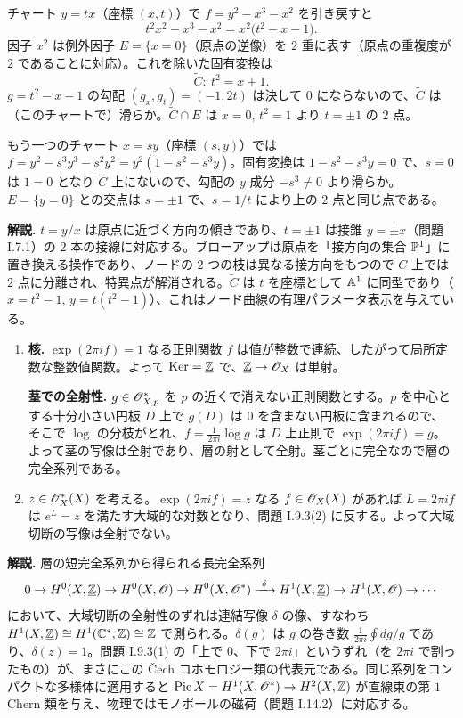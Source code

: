 チャート $y=tx$（座標 $(x,t)$）で $f=y^2-x^3-x^2$ を引き戻すと
\[
  t^2x^2-x^3-x^2=x^2\bigl(t^2-x-1\bigr).
\]
因子 $x^2$ は例外因子 $E=\{x=0\}$（原点の逆像）を $2$ 重に表す（原点の重複度が $2$ であることに対応）。これを除いた固有変換は
\[
  \widetilde C:\ t^2=x+1.
\]
$g=t^2-x-1$ の勾配 $(g_x,g_t)=(-1,2t)$ は決して $0$ にならないので、$\widetilde C$ は（このチャートで）滑らか。$\widetilde C\cap E$ は $x=0$, $t^2=1$ より $t=\pm1$ の $2$ 点。

もう一つのチャート $x=sy$（座標 $(s,y)$）では $f=y^2-s^3y^3-s^2y^2=y^2(1-s^2-s^3y)$。固有変換は $1-s^2-s^3y=0$ で、$s=0$ は $1=0$ となり $\widetilde C$ 上にないので、勾配の $y$ 成分 $-s^3\neq0$ より滑らか。$E=\{y=0\}$ との交点は $s=\pm1$ で、$s=1/t$ により上の $2$ 点と同じ点である。

\textbf{解説.} $t=y/x$ は原点に近づく方向の傾きであり、$t=\pm1$ は接錐 $y=\pm x$（問題 I.7.1）の $2$ 本の接線に対応する。ブローアップは原点を「接方向の集合 $\mathbb{P}^1$」に置き換える操作であり、ノードの $2$ つの枝は異なる接方向をもつので $\widetilde C$ 上では $2$ 点に分離され、特異点が解消される。$\widetilde C$ は $t$ を座標として $\mathbb{A}^1$ に同型であり（$x=t^2-1$, $y=t(t^2-1)$）、これはノード曲線の有理パラメータ表示を与えている。

\begin{enumerate}
  \item \textbf{核.} $\exp(2\pi if)=1$ なる正則関数 $f$ は値が整数で連続、したがって局所定数な整数値関数。よって $\operatorname{Ker}=\underline{\mathbb{Z}}$ で、$\underline{\mathbb{Z}}\to\mathscr{O}_X$ は単射。

  \textbf{茎での全射性.} $g\in\mathscr{O}_{X,p}^*$ を $p$ の近くで消えない正則関数とする。$p$ を中心とする十分小さい円板 $D$ 上で $g(D)$ は $0$ を含まない円板に含まれるので、そこで $\log$ の分枝がとれ、$f=\frac1{2\pi i}\log g$ は $D$ 上正則で $\exp(2\pi if)=g$。よって茎の写像は全射であり、層の射として全射。茎ごとに完全なので層の完全系列である。
  \item $z\in\mathscr{O}_X^*(X)$ を考える。$\exp(2\pi if)=z$ なる $f\in\mathscr{O}_X(X)$ があれば $L=2\pi if$ は $e^L=z$ を満たす大域的な対数となり、問題 I.9.3(2) に反する。よって大域切断の写像は全射でない。
\end{enumerate}
\textbf{解説.} 層の短完全系列から得られる長完全系列
\[
  0\to H^0(X,\underline{\mathbb{Z}})\to H^0(X,\mathscr{O})\to H^0(X,\mathscr{O}^*)\xrightarrow{\ \delta\ }H^1(X,\underline{\mathbb{Z}})\to H^1(X,\mathscr{O})\to\cdots
\]
において、大域切断の全射性のずれは連結写像 $\delta$ の像、すなわち $H^1(X,\underline{\mathbb{Z}})\cong H^1(\mathbb{C}^*,\mathbb{Z})\cong\mathbb{Z}$ で測られる。$\delta(g)$ は $g$ の巻き数 $\frac1{2\pi i}\oint dg/g$ であり、$\delta(z)=1$。問題 I.9.3(1) の「上で $0$、下で $2\pi i$」というずれ（を $2\pi i$ で割ったもの）が、まさにこの Čech コホモロジー類の代表元である。同じ系列をコンパクトな多様体に適用すると $\operatorname{Pic} X=H^1(X,\mathscr{O}^*)\to H^2(X,\mathbb{Z})$ が直線束の第 $1$ Chern 類を与え、物理ではモノポールの磁荷（問題 I.14.2）に対応する。


